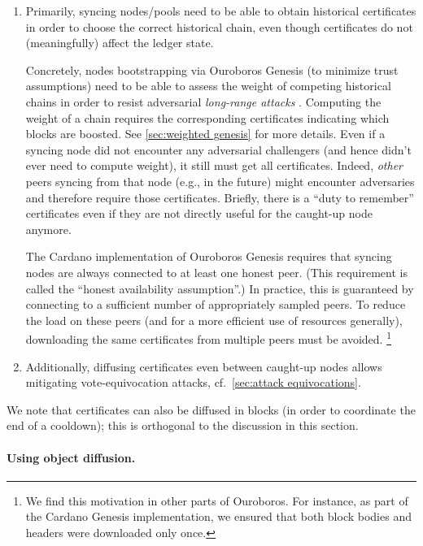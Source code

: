 \begin{enumerate}
\item\label{enumi:cert diffusion:syncing}
  Primarily, syncing nodes/pools need to be able to obtain historical certificates in order to choose the correct historical chain, even though certificates do not (meaningfully) affect the ledger state.

  Concretely, nodes bootstrapping via Ouroboros Genesis (to minimize trust assumptions) need to be able to assess the weight of competing historical chains in order to resist adversarial \emph{long-range attacks} \parencite{genesis-implementation-documentation}.
  Computing the weight of a chain requires the corresponding certificates indicating which blocks are boosted.
  See \cref{sec:weighted genesis} for more details.
  Even if a syncing node did not encounter any adversarial challengers (and hence didn't ever need to compute weight), it still must get all certificates. Indeed, \emph{other} peers syncing from that node (e.g., in the future) might encounter adversaries and therefore require those certificates.
  Briefly, there is a \enquote{duty to remember} certificates even if they are not directly useful for the caught-up node anymore.

  The Cardano implementation of Ouroboros Genesis \parencite{genesis-implementation-documentation} requires that syncing nodes are always connected to at least one honest peer.
  (This requirement is called the \enquote{honest availability assumption}.)
  In practice, this is guaranteed by connecting to a sufficient number of appropriately sampled peers.
  To reduce the load on these peers (and for a more efficient use of resources generally), downloading the same certificates from multiple peers must be avoided.%
%
\footnote{We find this motivation in other parts of Ouroboros. For instance, as part of the Cardano Genesis implementation, we ensured that both block bodies and headers were downloaded only once.\cite{genesis-implementation-documentation}}
\item\label{enumi:cert diffusion:caught up}
  Additionally, diffusing certificates even between caught-up nodes allows mitigating vote-equivocation attacks, cf.~\cref{sec:attack equivocations}.
\end{enumerate}

We note that certificates can also be diffused in blocks (in order to coordinate the end of a cooldown); this is orthogonal to the discussion in this section.

\paragraph{Using object diffusion.}


